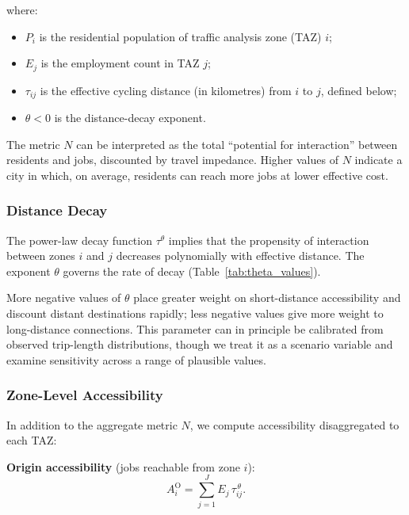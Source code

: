 \documentclass[12pt,a4paper]{article}
\begin{document}
\noindent where:
\begin{itemize}[leftmargin=*,nosep]
    \item $P_i$ is the residential population of traffic analysis zone (TAZ) $i$;
    \item $E_j$ is the employment count in TAZ $j$;
    \item $\tau_{ij}$ is the effective cycling distance (in kilometres) from $i$ to $j$, defined below;
    \item $\theta < 0$ is the distance-decay exponent.
\end{itemize}

\noindent The metric $N$ can be interpreted as the total ``potential for interaction'' between residents and jobs, discounted by travel impedance. Higher values of $N$ indicate a city in which, on average, residents can reach more jobs at lower effective cost.

\subsubsection{Distance Decay}

The power-law decay function $\tau^{\theta}$ implies that the propensity of interaction between zones $i$ and $j$ decreases polynomially with effective distance. The exponent $\theta$ governs the rate of decay (Table~\ref{tab:theta_values}).



More negative values of $\theta$ place greater weight on short-distance accessibility and discount distant destinations rapidly; less negative values give more weight to long-distance connections. This parameter can in principle be calibrated from observed trip-length distributions, though we treat it as a scenario variable and examine sensitivity across a range of plausible values.

\subsubsection{Zone-Level Accessibility}

In addition to the aggregate metric $N$, we compute accessibility disaggregated to each TAZ:

\textbf{Origin accessibility} (jobs reachable from zone $i$):
\begin{equation}
A_i^{\mathrm{O}} = \sum_{j=1}^{J} E_j \, \tau_{ij}^{\,\theta}.
\label{eq:origin_acc}
\end{equation}
\end{document}
